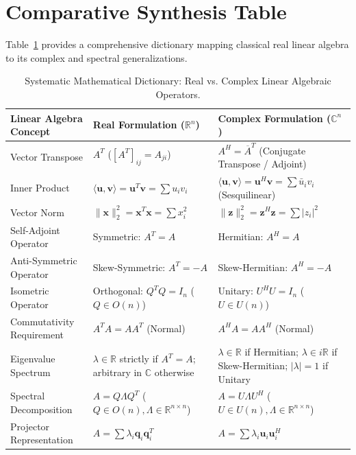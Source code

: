 \section{Comparative Synthesis Table}

Table~\ref{tab:real_vs_complex} provides a comprehensive dictionary mapping classical real linear algebra to its complex and spectral generalizations.

\begin{table}[htbp]
\centering
\small
\begin{tabularx}{\textwidth}{lXX}
\toprule
\textbf{Linear Algebra Concept} & \textbf{Real Formulation ($\mathbb{R}^n$)} & \textbf{Complex Formulation ($\mathbb{C}^n$)} \\
\midrule
Vector Transpose & $A^T$ ($[A^T]_{ij} = A_{ji}$) & $A^H = \overline{A}^T$ (Conjugate Transpose / Adjoint) \\
\addlinespace
Inner Product & $\langle \mathbf{u}, \mathbf{v} \rangle = \mathbf{u}^T \mathbf{v} = \sum u_i v_i$ & $\langle \mathbf{u}, \mathbf{v} \rangle = \mathbf{u}^H \mathbf{v} = \sum \bar{u}_i v_i$ (Sesquilinear) \\
\addlinespace
Vector Norm & $\|\mathbf{x}\|_2^2 = \mathbf{x}^T \mathbf{x} = \sum x_i^2$ & $\|\mathbf{z}\|_2^2 = \mathbf{z}^H \mathbf{z} = \sum |z_i|^2$ \\
\addlinespace
Self-Adjoint Operator & Symmetric: $A^T = A$ & Hermitian: $A^H = A$ \\
\addlinespace
Anti-Symmetric Operator & Skew-Symmetric: $A^T = -A$ & Skew-Hermitian: $A^H = -A$ \\
\addlinespace
Isometric Operator & Orthogonal: $Q^T Q = I_n$ ($Q \in O(n)$) & Unitary: $U^H U = I_n$ ($U \in U(n)$) \\
\addlinespace
Commutativity Requirement & $A^T A = A A^T$ (Normal) & $A^H A = A A^H$ (Normal) \\
\addlinespace
Eigenvalue Spectrum & $\lambda \in \mathbb{R}$ strictly if $A^T = A$; arbitrary in $\mathbb{C}$ otherwise & $\lambda \in \mathbb{R}$ if Hermitian; $\lambda \in i\mathbb{R}$ if Skew-Hermitian; $|\lambda| = 1$ if Unitary \\
\addlinespace
Spectral Decomposition & $A = Q \Lambda Q^T$ ($Q \in O(n), \Lambda \in \mathbb{R}^{n \times n}$) & $A = U \Lambda U^H$ ($U \in U(n), \Lambda \in \mathbb{R}^{n \times n}$) \\
\addlinespace
Projector Representation & $A = \sum \lambda_i \mathbf{q}_i \mathbf{q}_i^T$ & $A = \sum \lambda_i \mathbf{u}_i \mathbf{u}_i^H$ \\
\bottomrule
\end{tabularx}
\caption{Systematic Mathematical Dictionary: Real vs. Complex Linear Algebraic Operators.}
\label{tab:real_vs_complex}
\end{table}

